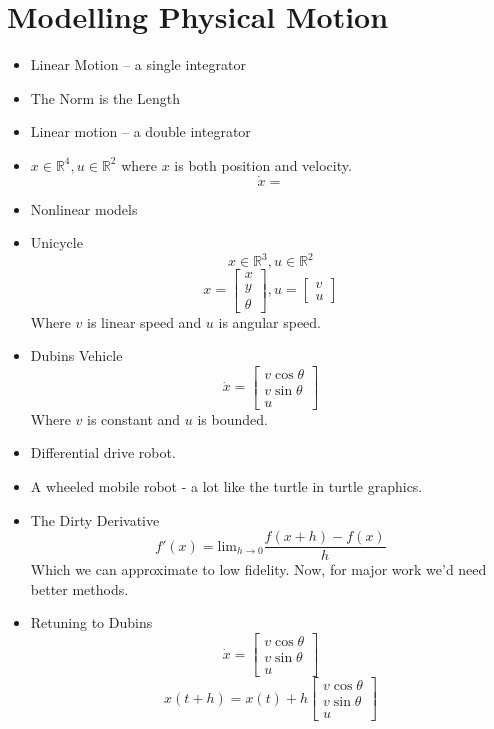 \documentclass{article}
\begin{document}
\section{Modelling Physical Motion}
\begin{itemize}
\item Linear Motion -- a single integrator 
\item The Norm is the Length 
\item Linear motion -- a double integrator
\item $x \in \mathbb{R}^4, u \in \mathbb{R}^2$ where $x$ is both position and velocity.
\[ \dot{x} = \]
\item Nonlinear models
\item Unicycle 
\[ x \in \mathbb{R}^3, u \in \mathbb{R}^2 \]
\[ x = \begin{bmatrix} x \\ y \\ \theta \end{bmatrix}, 
u  = \begin{bmatrix} v \\ u \end{bmatrix} \]
Where $v$ is linear speed and $u$ is angular speed.

\item Dubins Vehicle 
\[ \dot{x} = \begin{bmatrix} v\cos \theta \\ v \sin \theta \\ u \end{bmatrix} \]
Where $v$ is constant and $u$ is bounded. 

\item Differential drive robot. 
\item A wheeled mobile robot - a lot like the turtle in turtle graphics. 
\item The Dirty Derivative
\[ f'(x) = \text{lim}_{h\rightarrow 0 }\frac{f(x+h) -f(x)}{h} \]
Which we can approximate to low fidelity. Now, for major work we'd need better
methods. 
\item Retuning to Dubins
\[ \dot{x} = \begin{bmatrix}  v\cos \theta \\ v \sin \theta \\ u \end{bmatrix}
\]
\[ x(t+h) = x(t) + h \begin{bmatrix} v \cos \theta \\ v \sin \theta \\ u
\end{bmatrix} \]


\end{itemize}
\end{document}
